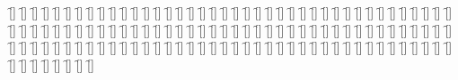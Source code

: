 \begin{questions}
\begin{multicols}{2}
        \question  \f[]
        \question  \f[]
        \question  \f[]
        \question  \f[]
        \question  \f[]
        \question  \f[]
        \question  \f[]
        \question  \f[]
        \question  \f[]
        \question  \f[]
        \question  \f[]
        \question  \f[]
        \question  \f[]
        \question  \f[]
        \question  \f[]
        \question  \f[]
        \question  \f[]
        \question  \f[]
        \question  \f[]
        \question  \f[]
        \question  \f[]
        \question  \f[]
        \question  \f[]
        \question  \f[]
        \question  \f[]
        \question  \f[]
        \question  \f[]
        \question  \f[]
        \question  \f[]
        \question  \f[]
        \question  \f[]
        \question  \f[]
        \question  \f[]
        \question  \f[]
        \question  \f[]
        \question  \f[]
        \question  \f[]
        \question  \f[]
        \question  \f[]
        \question  \f[]
        \question  \f[]
        \question  \f[]
        \question  \f[]
        \question  \f[]
        \question  \f[]
        \question  \f[]
        \question  \f[]
        \question  \f[]
        \question  \f[]
        \question  \f[]
        \question  \f[]
        \question  \f[]
        \question  \f[]
        \question  \f[]
        \question  \f[]
        \question  \f[]
        \question  \f[]
        \question  \f[]
        \question  \f[]
        \question  \f[]
        \question  \f[]
        \question  \f[]
        \question  \f[]
        \question  \f[]
        \question  \f[]
        \question  \f[]
        \question  \f[]
        \question  \f[]
        \question  \f[]
        \question  \f[]
        \question  \f[]
        \question  \f[]
        \question  \f[]
        \question  \f[]
        \question  \f[]
        \question  \f[]
        \question  \f[]
        \question  \f[]
        \question  \f[]
        \question  \f[]
        \question  \f[]
        \question  \f[]
        \question  \f[]
        \question  \f[]
        \question  \f[]
        \question  \f[]
        \question  \f[]
        \question  \f[]
        \question  \f[]
        \question  \f[]
        \question  \f[]
        \question  \f[]
        \question  \f[]
        \question  \f[]
        \question  \f[]
        \question  \f[]
        \question  \f[]
        \question  \f[]
        \question  \f[]
        \question  \f[]
        \question  \f[]
        \question  \f[]
        \question  \f[]
        \question  \f[]
        \question  \f[]
        \question  \f[]
        \question  \f[]
        \question  \f[]
        \question  \f[]
        \question  \f[]
        \question  \f[]
        \question  \f[]
        \question  \f[]
        \question  \f[]
        \question  \f[]
        \question  \f[]
        \question  \f[]
        \question  \f[]
        \question  \f[]
        \question  \f[]
        \question  \f[]
        \question  \f[]
        \question  \f[]
        \question  \f[]
        \question  \f[]
        \question  \f[]
        \question  \f[]
        \question  \f[]
    \end{multicols}
\end{questions}

